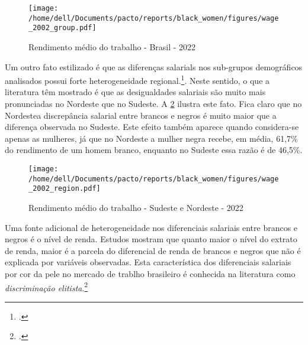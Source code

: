 \documentclass[12pt]{article}
\begin{document}
\begin{figure}[H]
    \centering
    \caption{Rendimento médio do trabalho - Brasil - 2022}
        \texttt{[image: /home/dell/Documents/pacto/reports/black\_women/figures/wage\_2002\_group.pdf]}
    \label{fig:rendimento_trabalho}
\end{figure}

\par Um outro fato estilizado é que as diferenças salarials nos sub-grupos demográficos analisados possui forte heterogeneidade regional.\footcite{campante2004desigualdade}. Neste sentido, o que a literatura têm mostrado é que as desigualdades salariais são muito mais pronunciadas no Nordeste que no Sudeste. A \ref{fig:rendimento_regiao} ilustra este fato. Fica claro que no Nordestea discrepância salarial entre brancos e negros é muito maior que a diferença observada no Sudeste. Este efeito também aparece quando considera-se apenas as mulheres, já que no Nordeste a mulher negra recebe, em média, 61,7\% do rendimento de um homem branco, enquanto no Sudeste essa razão é de 46,5\%.


\begin{figure}[H]
    \centering
    \caption{Rendimento médio do trabalho - Sudeste e Nordeste - 2022}
        \texttt{[image: /home/dell/Documents/pacto/reports/black\_women/figures/wage\_2002\_region.pdf]}
    \label{fig:rendimento_regiao}
\end{figure}

\par Uma fonte adicional de heterogeneidade nos diferenciais salariais entre brancos e negros é o nível de renda. Estudos mostram que quanto maior o nível do extrato de renda, maior é a parcela do diferencial de renda de brancos e negros que não é explicada por variáveis observadas. Esta característica dos diferenciais salariais por cor da pele no mercado de trablho brasileiro é conhecida na literatura como \textit{discriminação elitista}.\footcite[]{soares2000perfil,campante2004desigualdade}



%
\end{document}
